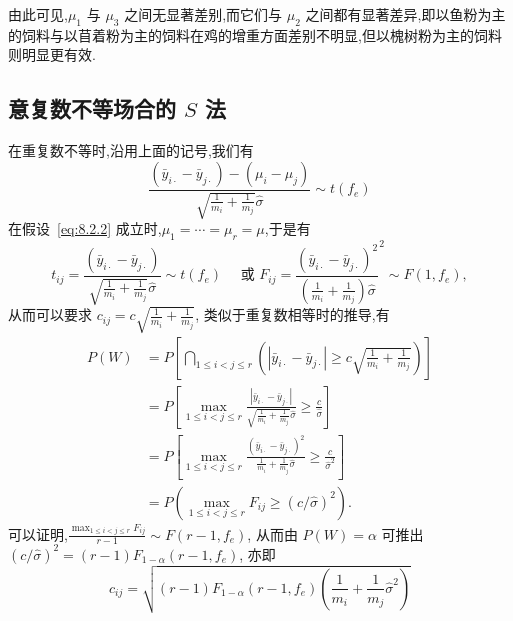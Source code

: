 由此可见,$\mu_1$ 与 $\mu_3$ 之间无显著差别,而它们与 $\mu_2$ 之间都有显著差异,即以鱼粉为主的饲料与以苜着粉为主的饲料在鸡的增重方面差别不明显,但以槐树粉为主的饲料则明显更有效.

\subsection[意复数不等场合的 S 法]{意复数不等场合的 $S$ 法}

在重复数不等时,沿用上面的记号,我们有
\begin{equation*}
  \frac{(\bar{y}_{i\cdot} - \bar{y}_{j\cdot}) - (\mu_i - \mu_j)}{\sqrt{\frac{1}{m_i}+\frac{1}{m_j}}\hat{\sigma}} \sim t(f_e)
\end{equation*}
在假设~\eqref{eq:8.2.2} 成立时,$\mu_1 = \cdots = \mu_r = \mu$,于是有
\begin{equation*}
  t_{ij} =   \frac{(\bar{y}_{i\cdot} - \bar{y}_{j\cdot})}{\sqrt{\frac{1}{m_i}+\frac{1}{m_j}}\hat{\sigma}} \sim t(f_e) \quad \text{ 或 } F_{ij} = \frac{(\bar{y}_{i\cdot} - \bar{y}_{j\cdot})^2}{\left(\frac{1}{m_i}+\frac{1}{m_j}\right)\hat{\sigma}}^2 \sim F(1, f_e),
\end{equation*}
从而可以要求 $c_{ij} = c \sqrt{\frac{1}{m_i}+\frac{1}{m_j}}$, 类似于重复数相等时的推导,有
\begin{align*}
  P(W) & = P \left[\bigcap_{1\leq i < j \leq r} \left(|\bar{y}_{i\cdot} - \bar{y}_{j\cdot}| \geq c \sqrt{\frac{1}{m_i}+\frac{1}{m_j}}\right)\right] \\
       & = P \left[\max_{1 \leq i < j \leq r} \frac{|\bar{y}_{i\cdot} - \bar{y}_{j\cdot}|}{\sqrt{\frac{1}{m_i}+\frac{1}{m_j}}\hat{\sigma}} \geq \frac{c}{\hat{\sigma}}\right] \\
       & = P \left[\max_{1 \leq i < j \leq r} \frac{(\bar{y}_{i\cdot} - \bar{y}_{j\cdot})^2}{\frac{1}{m_i}+\frac{1}{m_j}\hat{\sigma}} \geq \frac{c}{\hat{\sigma}^2}\right] \\
       & = P(\max_{1\leq i < j \leq r} F_{ij} \geq (c/\hat{\sigma})^2).
\end{align*}
可以证明,$\frac{\max_{1\leq i < j \leq r} F_{ij}}{r-1} \sim F(r-1, f_e)$, 从而由 $P(W)=\alpha$ 可推出 $(c/\hat{\sigma})^2 = (r-1) F_{1-\alpha} (r-1, f_e)$, 亦即
\begin{equation*}
  c_{ij} = \sqrt{(r-1) F_{1-\alpha}(r-1, f_e) \left(\frac{1}{m_i} + \frac{1}{m_j} \hat{\sigma}^2\right)}
\end{equation*}

